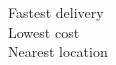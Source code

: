\documentclass[preview]{standalone}
\begin{document}
Fastest delivery\\Lowest cost\\Nearest location\\
\end{document}
